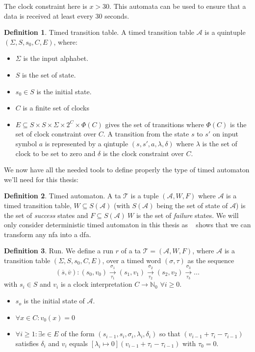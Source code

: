 \documentclass[12pt]{article}
\theoremstyle{definition}
\newtheorem{definition}{Definition}[section]
\theoremstyle{definition}
\theoremstyle{remark}
\newcommand{\A}{\mathcal{A}}
\begin{document}
The clock constraint here is $x > 30$. This automata can be used to ensure that a data is received at least every 30 seconds.

\theoremstyle{definition}
\begin{definition}{Timed transition table.} A timed transition table $\A$ is a quintuple $(\Sigma, S, s_{0},C, E)$, where:
\begin{itemize}
\item $\Sigma$ is the input alphabet.
\item $S$ is the set of state.
\item $s_{0} \in S$ is the initial state.
\item $C$ is a finite set of clocks
\item $E \subseteq S \times S \times \Sigma \times 2^{C} \times \Phi(C)$ gives the set of transitions where $\Phi(C)$ is the set of clock constraint over $C$. A transition from the state $s$ to $s'$ on input symbol $a$ is represented by a qintuple $(s, s', a, \lambda, \delta)$ where $\lambda$ is the set of clock to be set to zero and $\delta$ is the clock constraint over $C$.
\end{itemize}
\end{definition}

We now have all the needed tools to define properly the type of timed automaton we'll need for this thesis:

\theoremstyle{definition}
\begin{definition}{Timed automaton.} A \gls{ta} $\mathcal{T}$ is a tuple $(\A, W, F)$ where $\A$ is a timed transition table, $W \subseteq S(\A)$ (with $S(\A)$ being the set of state of $\A$) is the set of \textit{success} states and $F \subseteq S(\A) \ W$ is the set of \textit{failure} states. We will only consider deterministic timed automaton in this thesis as ~\cite{10.1007/3-540-63174-7_12} shows that we can transform any \gls{nfa} into a \gls{dfa}.
\end{definition}

\theoremstyle{definition}
\begin{definition}{Run.} We define a run $r$ of a \gls{ta} $\mathcal{T} = (\A, W, F)$, where $\A$ is a transition table $(\Sigma, S, s_{0},C, E)$, over a timed word $(\sigma, \tau)$ as the sequence
$$(\overline{s}, \overline{v}): (s_0, v_0) \xrightarrow[\tau_1]{\sigma_1} (s_1, v_1) \xrightarrow[\tau_2]{\sigma_2} (s_2, v_2) \xrightarrow[\tau_3]{\sigma_3} ...$$
with $s_i \in S$ and $v_i$ is a clock interpretation $C \to \mathbb{N}_0$ $\forall i \ge 0$.
\begin{itemize}
\item $s_o$ is the initial state of $\A$.
\item $\forall x \in C: v_0(x) = 0$
\item $\forall i \ge 1: \exists e \in E$ of the form $(s_{i-1}, s_i, \sigma_i, \lambda_i, \delta_i)$ so that $(v_{i-1} + \tau_i - \tau_{i-1})$ satisfies $\delta_i$ and $v_i$ equals $[\lambda_i \mapsto 0](v_{i-1} + \tau_i - \tau_{i-1})$ with $\tau_0 = 0$.~\cite{ALUR1994183}
\end{itemize}
\end{definition}
\end{document}
